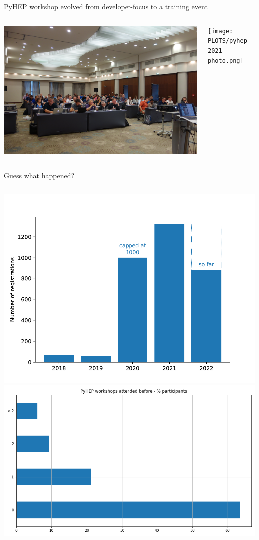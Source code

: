 \documentclass[aspectratio=169]{beamer}
\begin{document}
\begin{frame}{PyHEP workshop evolved from developer-focus to a training event}
\vspace{0.5 cm}

\begin{columns}
\includegraphics[width=\linewidth]{PLOTS/pyhep-2018-photo.jpg}

\texttt{[image: PLOTS/pyhep-2021-photo.png]}

\end{columns}
\end{frame}

\begin{frame}{Guess what happened?}
\begin{columns}
\includegraphics[height=5 cm]{PLOTS/pyhep-num-registrations.pdf}\includegraphics[height=5 cm]{PLOTS/registrations_nr_pyhep_attended.png}
\end{columns}
\end{frame}
\end{document}
